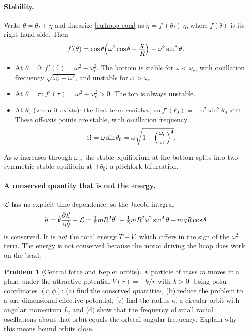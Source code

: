 \documentclass[11pt]{article}
\theoremstyle{definition}
\newtheorem{problem}{Problem}
\newcommand{\Lag}{\mathcal{L}}
\begin{document}
\paragraph{Stability.} Write $\theta = \theta_* + \eta$ and linearize \eqref{eq:hoop-eom} as $\ddot\eta = f'(\theta_*)\,\eta$, where $f(\theta)$ is its right-hand side. Then
\[
  f'(\theta) = \cos\theta\qty(\omega^2\cos\theta - \frac{g}{R}) - \omega^2\sin^2\theta.
\]
\begin{itemize}[nosep]
  \item At $\theta = 0$: $f'(0) = \omega^2 - \omega_c^2$. The bottom is stable for $\omega < \omega_c$, with oscillation frequency $\sqrt{\omega_c^2 - \omega^2}$, and unstable for $\omega > \omega_c$.
  \item At $\theta = \pi$: $f'(\pi) = \omega^2 + \omega_c^2 > 0$. The top is always unstable.
  \item At $\theta_0$ (when it exists): the first term vanishes, so $f'(\theta_0) = -\omega^2\sin^2\theta_0 < 0$. These off-axis points are stable, with oscillation frequency
  \[
    \Omega = \omega\sin\theta_0 = \omega\sqrt{1 - \qty(\frac{\omega_c}{\omega})^4}.
  \]
\end{itemize}
As $\omega$ increases through $\omega_c$, the stable equilibrium at the bottom splits into two symmetric stable equilibria at $\pm\theta_0$: a pitchfork bifurcation.

\paragraph{A conserved quantity that is not the energy.} $\Lag$ has no explicit time dependence, so the Jacobi integral
\[
  h = \dot\theta\pdv{\Lag}{\dot\theta} - \Lag = \tfrac12 mR^2\dot\theta^2 - \tfrac12 mR^2\omega^2\sin^2\theta - mgR\cos\theta
\]
is conserved. It is \emph{not} the total energy $T + V$, which differs in the sign of the $\omega^2$ term. The energy is not conserved because the motor driving the hoop does work on the bead.

\begin{problem}[Central force and Kepler orbits]\label{prob:kepler}
A particle of mass $m$ moves in a plane under the attractive potential $V(r) = -k/r$ with $k > 0$. Using polar coordinates $(r, \phi)$: (a) find the conserved quantities, (b) reduce the problem to a one-dimensional effective potential, (c) find the radius of a circular orbit with angular momentum $L$, and (d) show that the frequency of small radial oscillations about that orbit equals the orbital angular frequency. Explain why this means bound orbits close.
\end{problem}
\end{document}
